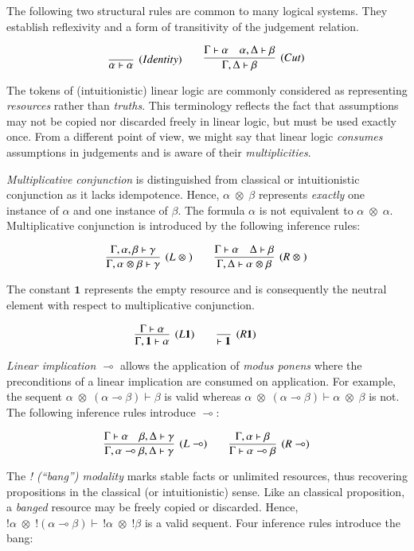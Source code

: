 \documentclass[acmtocl]{acmtrans2m}
\newcommand{\x}{{\;\otimes\;}}
\newcommand{\lp}{\multimap}
\newcommand{\lone}{\boldsymbol{1}}
\begin{document}
The following two structural rules are common to many logical systems. They establish
reflexivity and a form of transitivity of the judgement relation.

\[
\infer[(Identity)]{\alpha\vdash\alpha}{}
\quad\quad
\infer[(Cut)]{\Gamma,\Delta\vdash\beta}
    {\Gamma\vdash\alpha&\alpha,\Delta\vdash\beta}
\]

The tokens of (intuitionistic) linear logic are commonly considered as
representing \emph{resources} rather than \emph{truths}. This terminology
reflects the fact that assumptions may not be copied nor discarded freely in
linear logic, but must be used exactly once. From a different point of view, we
might say that linear logic \emph{consumes} assumptions in judgements and is
aware of their \emph{multiplicities}.

\emph{Multiplicative conjunction} is distinguished from classical or
intuitionistic conjunction as it lacks idempotence. Hence, $\alpha\x\beta$
represents \emph{exactly} one instance of $\alpha$ and one instance of $\beta$.
The formula $\alpha$ is not equivalent to $\alpha\x\alpha$. Multiplicative
conjunction is introduced by the following inference rules:

\[
\infer[(L\x)]{\Gamma,\alpha\x\beta\vdash\gamma}
    {\Gamma,\alpha,\beta\vdash\gamma}
\quad\quad
\infer[(R\x)]{\Gamma,\Delta\vdash\alpha\x\beta}
    {\Gamma\vdash\alpha&\Delta\vdash\beta}
\]

The constant $\lone$ represents the empty resource and is consequently the
neutral element with respect to multiplicative conjunction.

\[
\infer[(L\lone)]{\Gamma,\lone\vdash\alpha}{\Gamma\vdash\alpha}
\quad\quad
\infer[(R\lone)]{\vdash \lone}{}
\quad\quad
\]

\emph{Linear implication $\lp$} allows the application of \emph{modus ponens}
where the preconditions of a linear implication are consumed on application. For
example, the sequent $\alpha\x(\alpha\lp \beta)\vdash \beta$ is valid whereas
$\alpha\x(\alpha\lp \beta)\vdash \alpha\x \beta$ is not. The following inference
rules introduce $\lp$:

\[
\infer[(L\lp)]{\Gamma,\alpha\lp\beta,\Delta\vdash\gamma}
    {\Gamma\vdash\alpha&\beta,\Delta\vdash\gamma}
\quad\quad
\infer[(R\lp)]{\Gamma\vdash\alpha\lp\beta}
    {\Gamma,\alpha\vdash\beta}
\]

The \textit{! (``bang'') modality} marks stable facts or unlimited resources,
thus recovering propositions in the classical (or intuitionistic) sense. Like an
classical proposition, a \emph{banged} resource may be freely copied or
discarded. Hence, $!\alpha\x !(\alpha\lp \beta)\vdash \, !\alpha\x !\beta$ is a
valid sequent. Four inference rules introduce the bang:
\end{document}
